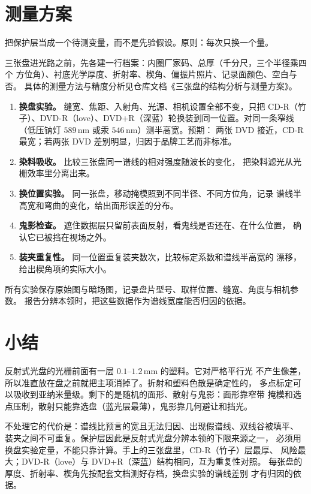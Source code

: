 \documentclass[a4paper,11pt]{ctexart}
\begin{document}
\section{测量方案}
\label{sec:experiment}

把保护层当成一个待测变量，而不是先验假设。原则：每次只换一个量。

三张盘进光路之前，先各建一行档案：内圈厂家码、总厚（千分尺，三个半径乘四个
方位角）、衬底光学厚度、折射率、楔角、偏振片照片、记录面颜色、空白与否。
具体的测量方法与精度分析见仓库文档《三张盘的结构分析与测量方案》。

\begin{enumerate}
\item \textbf{换盘实验。} 缝宽、焦距、入射角、光源、相机设置全部不变，只把
CD-R（竹子）、DVD-R（love）、DVD+R（深蓝）轮换装到同一位置。对同一条窄线
（低压钠灯 $589\,\mathrm{nm}$ 或汞 $546\,\mathrm{nm}$）测半高宽。预期：
两张 DVD 接近，CD-R 最宽；若两张 DVD 差别明显，归因于品牌工艺而非标准。
\item \textbf{染料吸收。} 比较三张盘同一谱线的相对强度随波长的变化，
把染料滤光从光栅效率里分离出来。
\item \textbf{换位置实验。} 同一张盘，移动掩模照到不同半径、不同方位角，记录
谱线半高宽和弯曲的变化，给出面形误差的分布。
\item \textbf{鬼影检查。} 遮住数据层只留前表面反射，看鬼线是否还在、在什么位置，
确认它已被挡在视场之外。
\item \textbf{装夹重复性。} 同一位置重复装夹数次，比较标定系数和谱线半高宽的
漂移，给出楔角项的实际大小。
\end{enumerate}

所有实验保存原始图与暗场图，记录盘片型号、取样位置、缝宽、角度与相机参数。
报告分辨本领时，把这些数据作为谱线宽度能否归因的依据。

\section{小结}

反射式光盘的光栅前面有一层 $0.1$--$1.2\,\mathrm{mm}$ 的塑料。它对严格平行光
不产生像差，所以准直放在盘之前就把主项消掉了。折射和塑料色散是确定性的，
多点标定可以吸收到亚纳米量级。剩下的是随机的面形、散射与鬼影：面形靠窄带
掩模和选点压制，散射只能靠选盘（蓝光层最薄），鬼影靠几何避让和挡光。

不处理它的代价是：谱线比预言的宽且无法归因、出现假谱线、双线谷被填平、
装夹之间不可重复。保护层因此是反射式光盘分辨本领的下限来源之一，
必须用换盘实验定量，不能只靠计算。手上的三张盘里，CD-R（竹子）层最厚、
风险最大；DVD-R（love）与 DVD+R（深蓝）结构相同，互为重复性对照。
每张盘的厚度、折射率、楔角先按配套文档测好存档，换盘实验的谱线差别
才有归因的依据。
\end{document}

